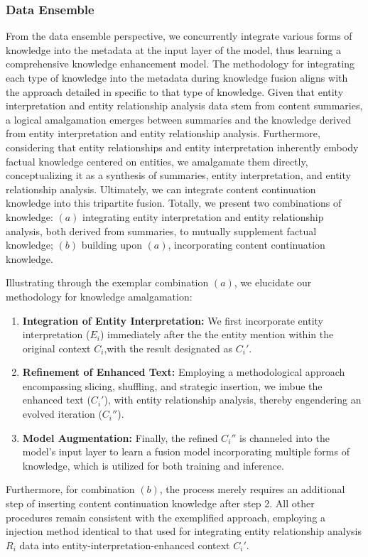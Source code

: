 \subsubsection{Data Ensemble}
\label{sec:data_ensemble}
 From the data ensemble perspective, we concurrently integrate various forms of knowledge into the metadata at the input layer of the model, thus learning a comprehensive knowledge enhancement model. The methodology for integrating each type of knowledge into the metadata during knowledge fusion aligns with the approach detailed in  specific to that type of knowledge. Given that entity interpretation and entity relationship analysis data stem from content summaries, a logical amalgamation emerges between summaries and the knowledge derived from entity interpretation and entity relationship analysis. Furthermore, considering that entity relationships and entity interpretation inherently embody factual knowledge centered on entities, we amalgamate them directly, conceptualizing it as a synthesis of summaries, entity interpretation, and entity relationship analysis. Ultimately, we can integrate content continuation knowledge into this tripartite fusion.
 Totally, we present two combinations of knowledge:
 $(a)$ integrating entity interpretation and entity relationship analysis, both derived from summaries, to mutually supplement factual knowledge;
 $(b)$ building upon $(a)$, incorporating content continuation knowledge.
 
 Illustrating through the exemplar combination $(a)$, we elucidate our methodology for knowledge amalgamation:
 \begin{enumerate}
 	\item \textbf{Integration of Entity Interpretation:} We first incorporate entity interpretation ($E_i$) immediately after the the entity mention within the original context $C_i$,with the result designated as $C_i'$.
 	\item \textbf{Refinement of Enhanced Text:} Employing a methodological approach encompassing slicing, shuffling, and strategic insertion, we imbue the enhanced text ($C_i'$), with  entity relationship analysis, thereby engendering an evolved iteration ($C_i''$).
 	\item \textbf{Model Augmentation:} Finally, the refined $C_i''$ is channeled into the model's input layer to learn a fusion model incorporating multiple forms of knowledge, which is utilized for both training and inference.
 \end{enumerate}
 Furthermore, for combination $(b)$, the process merely requires an additional step of inserting content continuation knowledge after step 2. All other procedures remain consistent with the exemplified approach, employing a injection method identical to that used for integrating entity relationship analysis $R_i$ data into entity-interpretation-enhanced context $C_i'$.
 

